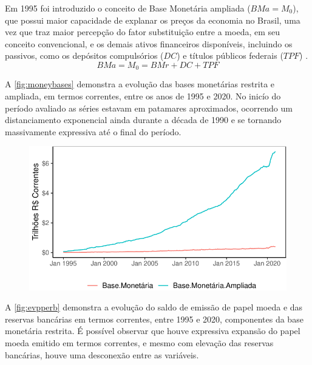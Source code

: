 \documentclass[12pt,12pt,openright,oneside,a4paper,chapter=TITLE,section=TITLE,subsection=TITLE,subsubsection=TITLE,english,french,spanish,portugues,sumario=tradicional]{abntex2}
\begin{document}
Em 1995 foi introduzido o conceito de Base Monetária ampliada (\(BMa = M_0\)), que possui maior capacidade de explanar os preços da economia no Brasil, uma vez que traz maior percepção do fator substituição entre a moeda, em seu conceito convencional, e os demais ativos financeiros disponíveis, incluindo os passivos, como os depósitos compulsórios (\(DC\)) e títulos públicos federais (\(TPF\)) \cite{bcb:2019}.
\[
BMa = M_0 = BMr + DC +  TPF
\]

A \autoref{fig:moneybases} demonstra a evolução das bases monetárias restrita e ampliada, em termos correntes, entre os anos de 1995 e 2020. No inicío do período avaliado as séries estavam em patamares aproximados, ocorrendo um distanciamento exponencial ainda durante a década de 1990 e se tornando massivamente expressiva até o final do período.

\begin{figure}

\begin{center}\includegraphics{12-exportedfigures/money base.d-1} \end{center}
\label{fig:moneybases}
\end{figure}

A \autoref{fig:evpperb} demonstra a evolução do saldo de emissão de papel moeda e das reservas bancárias em termos correntes, entre 1995 e 2020, componentes da base monetária restrita. É possível observar que houve expressiva expansão do papel moeda emitido em termos correntes, e mesmo com elevação das reservas bancárias, houve uma desconexão entre as variáveis.
\end{document}

